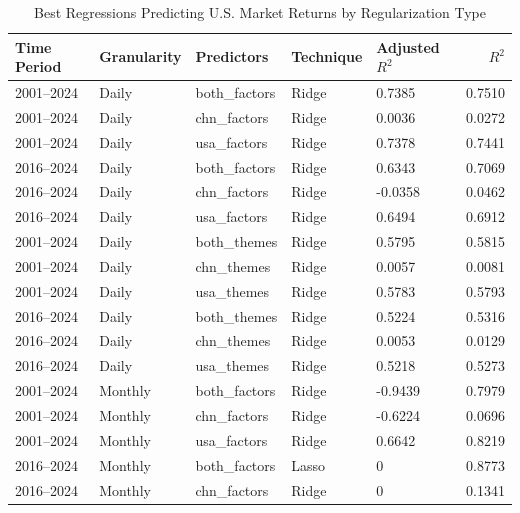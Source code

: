 \begin{table}[htbp]
\centering
\caption{Best Regressions Predicting U.S. Market Returns by Regularization Type}
\label{tab:usa_market_regularized_regression_summary}
\begin{tabular}{@{}lllllr@{}}
\toprule
Time Period & Granularity & Predictors     & Technique & Adjusted $R^2$ & $R^2$ \\ \midrule
2001--2024  & Daily       & both\_factors  & Ridge          & 0.7385         & 0.7510 \\
2001--2024  & Daily       & chn\_factors   & Ridge          & 0.0036         & 0.0272 \\
2001--2024  & Daily       & usa\_factors   & Ridge          & 0.7378         & 0.7441 \\
2016--2024  & Daily       & both\_factors  & Ridge          & 0.6343         & 0.7069 \\
2016--2024  & Daily       & chn\_factors   & Ridge          & -0.0358        & 0.0462 \\
2016--2024  & Daily       & usa\_factors   & Ridge          & 0.6494         & 0.6912 \\
2001--2024  & Daily       & both\_themes   & Ridge          & 0.5795         & 0.5815 \\
2001--2024  & Daily       & chn\_themes    & Ridge          & 0.0057         & 0.0081 \\
2001--2024  & Daily       & usa\_themes    & Ridge          & 0.5783         & 0.5793 \\
2016--2024  & Daily       & both\_themes   & Ridge          & 0.5224         & 0.5316 \\
2016--2024  & Daily       & chn\_themes    & Ridge          & 0.0053         & 0.0129 \\
2016--2024  & Daily       & usa\_themes    & Ridge          & 0.5218         & 0.5273 \\
2001--2024  & Monthly     & both\_factors  & Ridge          & -0.9439        & 0.7979 \\
2001--2024  & Monthly     & chn\_factors   & Ridge          & -0.6224        & 0.0696 \\
2001--2024  & Monthly     & usa\_factors   & Ridge          & 0.6642         & 0.8219 \\
2016--2024  & Monthly     & both\_factors  & Lasso          & 0         & 0.8773 \\
2016--2024  & Monthly     & chn\_factors   & Ridge          & 0         & 0.1341 \\

\end{tabular}
\end{table}

